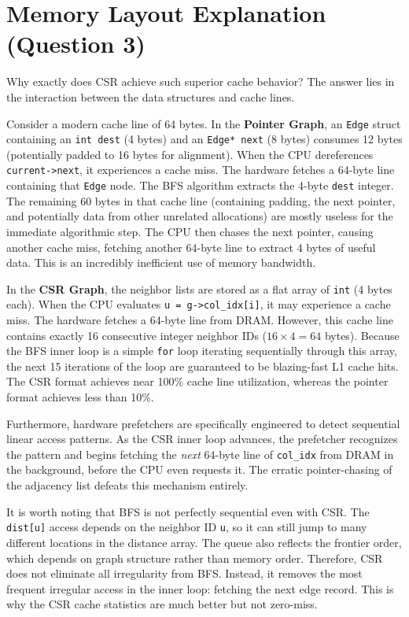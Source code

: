 \documentclass[11pt]{article}
\begin{document}
\section{Memory Layout Explanation (Question 3)}

Why exactly does CSR achieve such superior cache behavior? The answer lies in the interaction between the data structures and cache lines.

Consider a modern cache line of 64 bytes. 
In the \textbf{Pointer Graph}, an \texttt{Edge} struct containing an \texttt{int dest} (4 bytes) and an \texttt{Edge* next} (8 bytes) consumes 12 bytes (potentially padded to 16 bytes for alignment). When the CPU dereferences \texttt{current->next}, it experiences a cache miss. The hardware fetches a 64-byte line containing that \texttt{Edge} node. The BFS algorithm extracts the 4-byte \texttt{dest} integer. The remaining 60 bytes in that cache line (containing padding, the next pointer, and potentially data from other unrelated allocations) are mostly useless for the immediate algorithmic step. The CPU then chases the next pointer, causing another cache miss, fetching another 64-byte line to extract 4 bytes of useful data. This is an incredibly inefficient use of memory bandwidth.

In the \textbf{CSR Graph}, the neighbor lists are stored as a flat array of \texttt{int} (4 bytes each). When the CPU evaluates \texttt{u = g->col\_idx[i]}, it may experience a cache miss. The hardware fetches a 64-byte line from DRAM. However, this cache line contains exactly 16 consecutive integer neighbor IDs ($16 \times 4 = 64$ bytes). Because the BFS inner loop is a simple \texttt{for} loop iterating sequentially through this array, the next 15 iterations of the loop are guaranteed to be blazing-fast L1 cache hits. The CSR format achieves near 100\% cache line utilization, whereas the pointer format achieves less than 10\%.

Furthermore, hardware prefetchers are specifically engineered to detect sequential linear access patterns. As the CSR inner loop advances, the prefetcher recognizes the pattern and begins fetching the \textit{next} 64-byte line of \texttt{col\_idx} from DRAM in the background, before the CPU even requests it. The erratic pointer-chasing of the adjacency list defeats this mechanism entirely.

It is worth noting that BFS is not perfectly sequential even with CSR. The \texttt{dist[u]} access depends on the neighbor ID \texttt{u}, so it can still jump to many different locations in the distance array. The queue also reflects the frontier order, which depends on graph structure rather than memory order. Therefore, CSR does not eliminate all irregularity from BFS. Instead, it removes the most frequent irregular access in the inner loop: fetching the next edge record. This is why the CSR cache statistics are much better but not zero-miss.
\end{document}
